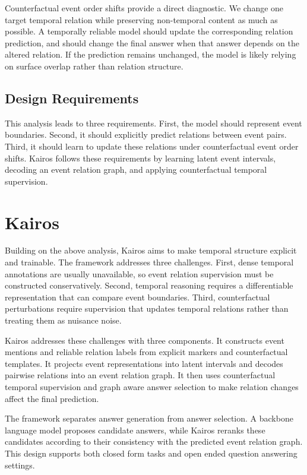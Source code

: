 \documentclass[11pt]{article}
\newcommand{\method}{Kairos}
\begin{document}
Counterfactual event order shifts provide a direct diagnostic. We change one target temporal relation while preserving non-temporal content as much as possible. A temporally reliable model should update the corresponding relation prediction, and should change the final answer when that answer depends on the altered relation. If the prediction remains unchanged, the model is likely relying on surface overlap rather than relation structure.

\subsection{Design Requirements}

This analysis leads to three requirements. First, the model should represent event boundaries. Second, it should explicitly predict relations between event pairs. Third, it should learn to update these relations under counterfactual event order shifts. \method{} follows these requirements by learning latent event intervals, decoding an event relation graph, and applying counterfactual temporal supervision.

\section{\method}
\label{sec:method}

Building on the above analysis, \method{} aims to make temporal structure explicit and trainable. The framework addresses three challenges. First, dense temporal annotations are usually unavailable, so event relation supervision must be constructed conservatively. Second, temporal reasoning requires a differentiable representation that can compare event boundaries. Third, counterfactual perturbations require supervision that updates temporal relations rather than treating them as nuisance noise.

\method{} addresses these challenges with three components. It constructs event mentions and reliable relation labels from explicit markers and counterfactual templates. It projects event representations into latent intervals and decodes pairwise relations into an event relation graph. It then uses counterfactual temporal supervision and graph aware answer selection to make relation changes affect the final prediction.

The framework separates answer generation from answer selection. A backbone language model proposes candidate answers, while \method{} reranks these candidates according to their consistency with the predicted event relation graph. This design supports both closed form tasks and open ended question answering settings.
\end{document}
